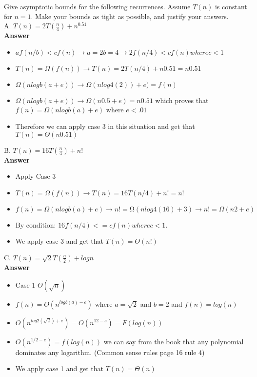 \documentclass{article}
\begin{document}
\noindent Give asymptotic bounds for the following recurrences. Assume
$T(n)$ is constant for $n = 1$. Make your bounds as tight as possible,
and justify your answers.\\

\noindent A. $T(n) = 2T(\frac{n}{4}) + n^{0.51}$\\

\textbf{ Answer }
\begin{itemize}
\item $af(n/b) < cf(n) → a = 2 b = 4 → 2f(n/4) < cf(n) where c < 1$
\item $T(n) = \Omega(f(n)) → T(n) = 2T(n/4) + n0.51 = n0.51$
\item $\Omega(nlogb(a+e)) → \Omega(nlog4(2))+e) = f(n)$
\item $\Omega(nlogb(a+e)) → \Omega(n0.5+e) = n0.51$  which proves that $f(n) = \Omega(nlogb(a)+e)$ where $e < .01$
\item Therefore we can apply case 3 in this situation and get that $T(n) = \Theta(n0.51)$
\end{itemize}

\noindent B. $T(n) = 16 T(\frac{n}{4}) + n!$\\

\textbf{ Answer }
\begin{itemize}
\item Apply Case 3
\item $T(n) = \Omega(f(n)) → T(n) = 16T(n/4) + n! = n!$
\item $f(n) = \Omega(nlogb(a) + e)  →  n! = Ω(nlog4(16) + 3) → n! = \Omega(n2+e)$
\item By condition: $16f(n/4)  <= cf(n) where c < 1$.  
\item We apply case 3 and get that $T(n) = \Theta(n!)$
\end{itemize}

\noindent C. $T(n) = \sqrt{2} T(\frac{n}{2}) + logn$\\

\textbf{ Answer }
\begin{itemize}
\item Case 1 $\Theta(\sqrt{n})$
\item $f(n) = O(n^{logb(a)-e})$ where $a = \sqrt{2}$  and $b = 2$ and $f(n) = log(n)$
\item $O(n^{log2(\sqrt{2})+e}) = O(n^{12 - e}) =F(log(n))$
\item $O(n^{1/2 - e}) = f(log(n))$ we can say from the book that any polynomial dominates any logarithm. (Common sense rules page 16 rule 4)
\item We apply case 1 and get that $T(n) = \Theta(n)$
\end{itemize}
\end{document}
